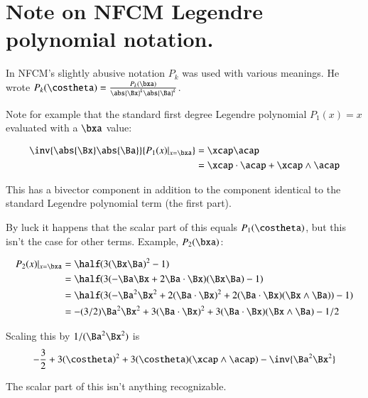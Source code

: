\section{ Note on NFCM Legendre polynomial notation. }

In NFCM's slightly abusive notation $P_k$ was used with various meanings.  He wrote $P_k(\costheta) = \frac{P_k(\bxa)}{\abs{\Bx}^k \abs{\Ba}^k}$.

Note for example that the standard first degree Legendre polynomial $P_1(x) = x$ evaluated with a $\bxa$ value:

\begin{align*}
\inv {\abs{\Bx}\abs{\Ba}} {P_1(x) \vert_{x=\bxa}} &= \xcap \acap \\
&= \xcap \cdot \acap + \xcap \wedge \acap \\
\end{align*}

This has a bivector component in addition to the component identical to the standard Legendre polynomial
term (the first part).

By luck it happens that the scalar part of this equals $P_1(\costheta)$, but this
isn't the case for other terms.  Example, $P_2(\bxa)$:

\begin{align*}
{P_2(x) \vert_{x=\bxa}} 
&= \half( 3(\Bx \Ba)^2 - 1 ) \\
&= \half( 3(-\Ba \Bx + 2 \Ba \cdot \Bx )(\Bx \Ba) - 1 ) \\
&= \half( 3(-\Ba^2 \Bx^2 + 2(\Ba \cdot \Bx)^2 + 2(\Ba \cdot \Bx)(\Bx \wedge \Ba)) - 1 ) \\
&=  -(3/2)\Ba^2 \Bx^2 + 3(\Ba \cdot \Bx)^2 + 3(\Ba \cdot \Bx)(\Bx \wedge \Ba) - 1/2  \\
\end{align*}

Scaling this by $1/(\Ba^2\Bx^2)$ is
\[
-\frac{3}{2} + 3(\costheta)^2 + 3(\costheta)(\xcap \wedge \acap) - \inv{\Ba^2\Bx^2} \\
\]

The scalar part of this isn't anything recognizable.
